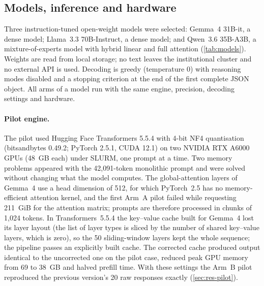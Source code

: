 \subsection{Models, inference and hardware}\label{sec:models}

Three instruction-tuned open-weight models were selected: Gemma~4 31B-it, a dense model; Llama~3.3
70B-Instruct, a dense model; and Qwen~3.6 35B-A3B, a mixture-of-experts model with hybrid linear and full
attention (\cref{tab:models}). Weights are read from local storage; no text leaves the institutional
cluster and no external API is used. Decoding is greedy (temperature 0) with reasoning modes disabled and a
stopping criterion at the end of the first complete JSON object. All arms of a model run with the same
engine, precision, decoding settings and hardware.

\paragraph{Pilot engine.} The pilot used Hugging Face Transformers 5.5.4 with 4-bit NF4 quantisation
(bitsandbytes 0.49.2; PyTorch 2.5.1, CUDA 12.1) on two NVIDIA RTX A6000 GPUs (48~GB each) under SLURM, one
prompt at a time. Two memory problems appeared with the 42{,}091-token monolithic prompt and were solved
without changing what the model computes. The global-attention layers of Gemma~4 use a head dimension of
512, for which PyTorch~2.5 has no memory-efficient attention kernel, and the first Arm~A pilot failed while
requesting 211~GiB for the attention matrix; prompts are therefore processed in chunks of 1{,}024 tokens.
In Transformers~5.5.4 the key--value cache built for Gemma~4 lost its layer layout (the list of layer
types is sliced by the number of shared key--value layers, which is zero), so the 50 sliding-window layers
kept the whole sequence; the pipeline passes an explicitly built cache. The corrected cache produced output
identical to the uncorrected one on the pilot case, reduced peak GPU memory from 69 to 38~GB and halved
prefill time. With these settings the Arm~B pilot reproduced the previous version's 20 raw responses
exactly (\cref{sec:res-pilot}).

